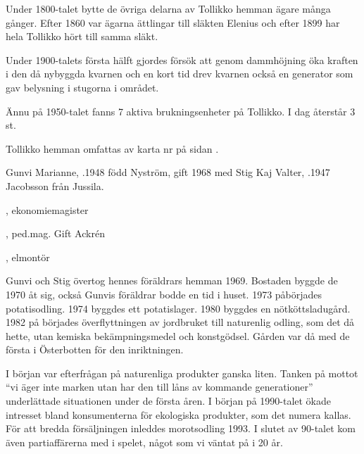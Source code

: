 Under 1800-talet bytte de övriga delarna av Tollikko hemman ägare många gånger. Efter 1860 var ägarna ättlingar till släkten Elenius och efter 1899 har hela Tollikko hört till samma släkt.

Under 1900-talets första hälft gjordes försök att genom dammhöjning öka kraften i den då nybyggda kvarnen och en kort tid drev kvarnen också en generator som gav belysning i stugorna i området.

Ännu på 1950-talet fanns 7 aktiva brukningsenheter på Tollikko. I dag återstår 3 st.

Tollikko hemman omfattas av karta nr  på sidan \pageref{map:16}.




%



%



%
Gunvi Marianne, .1948 född Nyström, gift 1968 med Stig Kaj Valter, .1947 Jacobsson från Jussila.
\begin{jhchildren}
  \item {}, ekonomiemagister
  \item {}, ped.mag. Gift Ackrén
  \item {}, elmontör
\end{jhchildren}
Gunvi och Stig övertog hennes föräldrars hemman 1969. Bostaden 	byggde de 1970 åt sig, också Gunvis föräldrar bodde en tid i huset. 1973 påbörjades potatisodling. 1974 byggdes ett potatislager. 1980 byggdes en nötköttsladugård. 1982 på börjades överflyttningen av jordbruket till naturenlig odling, som det då hette, utan kemiska bekämpningsmedel och konstgödsel. Gården var då med de första i Österbotten för den inriktningen.

I början var efterfrågan på naturenliga produkter ganska liten. Tanken på mottot ``vi äger inte marken utan har den till låns av kommande generationer'' underlättade situationen under de första åren. I början på 1990-talet ökade intresset bland konsumenterna för ekologiska produkter, som det numera kallas. För att bredda försäljningen inleddes morotsodling 1993. I slutet av 90-talet kom även partiaffärerna med i spelet, något som vi väntat på i 20 år.

